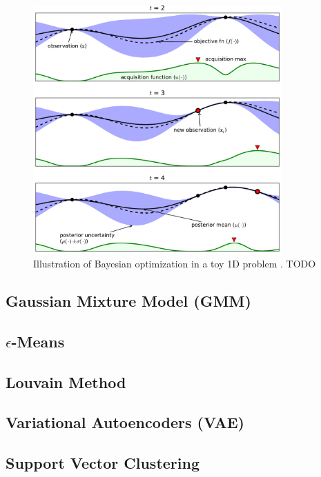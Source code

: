 \begin{figure}
\centering
\includegraphics[width=0.85\textwidth]{figures/ml/toyGPtext3.pdf}
\caption{
Illustration of Bayesian optimization in a toy 1D problem \cite{Brochu2010}.
TODO
}
\label{fig:additional:unsupervised:BO:BO_ex}
\end{figure}


\subsection{Gaussian Mixture Model (GMM)}
\label{additional:unsupervised:GMM}

\subsection{\texorpdfstring{$\epsilon$}{epsilon}-Means}
\label{additional:unsupervised:epsilonMean}

\subsection{Louvain Method}
\label{additional:unsupervised:louvain}

\subsection{Variational Autoencoders (VAE)}
\label{additional:unsupervised:VAE}

\subsection{Support Vector Clustering}
\label{additional:unsupervised:SVC}

